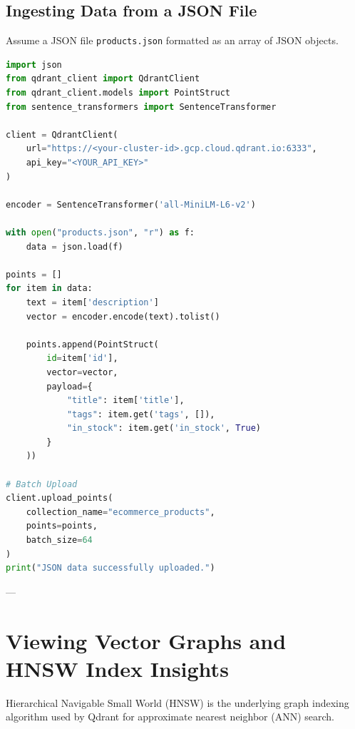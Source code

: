 \documentclass[11pt,a4paper]{article}
\begin{document}
\subsection{Ingesting Data from a JSON File}

Assume a JSON file \texttt{products.json} formatted as an array of JSON objects.

\begin{lstlisting}[language=Python, caption=Upload JSON Vectors to Qdrant]
import json
from qdrant_client import QdrantClient
from qdrant_client.models import PointStruct
from sentence_transformers import SentenceTransformer

client = QdrantClient(
    url="https://<your-cluster-id>.gcp.cloud.qdrant.io:6333",
    api_key="<YOUR_API_KEY>"
)

encoder = SentenceTransformer('all-MiniLM-L6-v2')

with open("products.json", "r") as f:
    data = json.load(f)

points = []
for item in data:
    text = item['description']
    vector = encoder.encode(text).tolist()
    
    points.append(PointStruct(
        id=item['id'],
        vector=vector,
        payload={
            "title": item['title'],
            "tags": item.get('tags', []),
            "in_stock": item.get('in_stock', True)
        }
    ))

# Batch Upload
client.upload_points(
    collection_name="ecommerce_products",
    points=points,
    batch_size=64
)
print("JSON data successfully uploaded.")
\end{lstlisting}

---

\section{Viewing Vector Graphs and HNSW Index Insights}

Hierarchical Navigable Small World (HNSW) is the underlying graph indexing algorithm used by Qdrant for approximate nearest neighbor (ANN) search.
\end{document}
